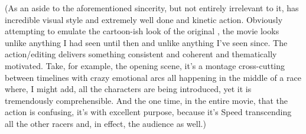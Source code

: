 \documentclass[../butidigress.tex]{subfiles}
\begin{document}

(As an aside to the aforementioned sincerity, but not entirely irrelevant to it,  has incredible visual style and extremely well done and kinetic action.
Obviously attempting to emulate the cartoon-ish look of the original , the movie looks unlike anything I had seen until then and unlike anything I've seen since.
The action/editing delivers something consistent and coherent and thematically motivated.
Take, for example, the opening scene, it's a montage cross-cutting between timelines with crazy emotional arcs all happening in the middle of a race where, I might add, all the characters are being introduced, yet it is tremendously comprehensible.
And the one time, in the entire movie, that the action is confusing, it's with excellent purpose, because it's Speed transcending all the other racers and, in effect, the audience as well.)
\end{document}
